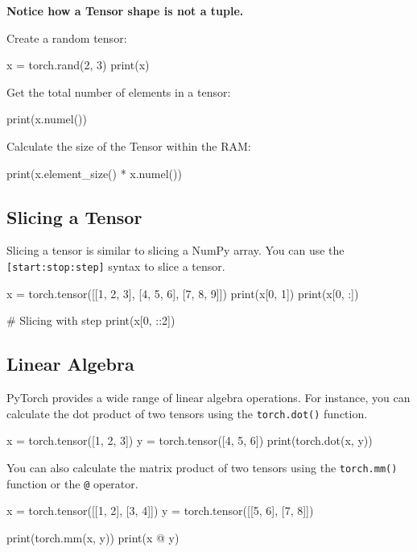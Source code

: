 \textbf{Notice how a Tensor shape is not a tuple.}

Create a random tensor:
\begin{codeblock}[language=python]
x = torch.rand(2, 3)
print(x)
\end{codeblock}

Get the total number of elements in a tensor:
\begin{codeblock}[language=python]
print(x.numel())
\end{codeblock}

Calculate the size of the Tensor within the RAM:
\begin{codeblock}[language=python]
print(x.element_size() * x.numel())
\end{codeblock}

\subsection{Slicing a Tensor}

Slicing a tensor is similar to slicing a NumPy array. You can use the \texttt{[start:stop:step]} syntax to slice a tensor.
\begin{codeblock}[language=python]
x = torch.tensor([[1, 2, 3], [4, 5, 6], [7, 8, 9]])
print(x[0, 1])
print(x[0, :])

# Slicing with step
print(x[0, ::2])
\end{codeblock}

\subsection{Linear Algebra}

PyTorch provides a wide range of linear algebra operations. For instance, you can calculate the dot product of two tensors using the \texttt{torch.dot()} function.
\begin{codeblock}[language=python]
x = torch.tensor([1, 2, 3])
y = torch.tensor([4, 5, 6])
print(torch.dot(x, y))
\end{codeblock}

You can also calculate the matrix product of two tensors using the \texttt{torch.mm()} function or the \texttt{@} operator.
\begin{codeblock}[language=python]
x = torch.tensor([[1, 2], [3, 4]])
y = torch.tensor([[5, 6], [7, 8]])

print(torch.mm(x, y))
print(x @ y)
\end{codeblock}


